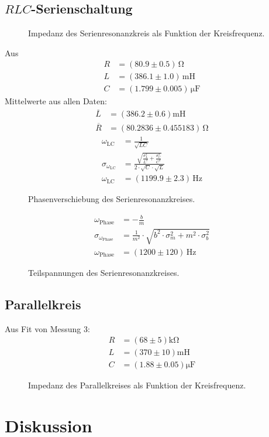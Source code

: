 \documentclass[12pt,a4paper,titlepage,headinclude,bibtotoc]{scrartcl}
\begin{document}
\subsection{$RLC$-Serienschaltung}
\begin{figure}[!htb]
	\centering
	
	\caption{Impedanz des Serienresonanzkreis als Funktion der Kreisfrequenz.}
	\label{fig:messung2}
\end{figure}
Aus
\begin{align}
	R &= (80.9 \pm 0.5)\,\si{\ohm}\\
	L &= (386.1 \pm 1.0)\,\si{\milli\henry}\\
	C &= (1.799 \pm 0.005)\,\si{\micro\farad}
\end{align}
Mittelwerte aus allen Daten:
\begin{align}
\overline L&=(386.2 \pm 0.6)\si{\milli\henry}\\
\overline R&=(80.2836 \pm 0.455183)\,\si{\ohm}
\end{align}
\begin{align}
\omega_\text{LC}&=\frac{1}{\sqrt{LC}}\\
\sigma_{\omega_\text{LC}}&=\frac{\sqrt{\frac{\sigma_{L}^{2}}{L^{2}} + \frac{\sigma_{C}^{2}}{C^{2}}}}{2 \cdot \sqrt{C} \cdot \sqrt{L}}\\
\omega_\text{LC}&=(1199.9 \pm 2.3)\,\si{\hertz}
\end{align}
\begin{figure}[!htb]
	\centering
	
	\caption{Phasenverschiebung des Serienresonanzkreises.}
	\label{fig:phase}
\end{figure}

\begin{align}
\omega_\text{Phase}&=- \frac{b}{m}\\
\sigma_{\omega_\text{Phase}}&=\frac{1}{m^{2}} \cdot \sqrt{b^{2} \cdot \sigma_{m}^{2} + m^{2} \cdot \sigma_{b}^{2}}\\
\omega_\text{Phase}&=(1200 \pm 120)\,\si\hertz
\end{align}
\begin{figure}[!htb]
	\centering
	
	\caption{Teilspannungen des Serienresonanzkreises.}
	\label{fig:teilU}
\end{figure}
\subsection{Parallelkreis}
Aus Fit von Messung 3:
\begin{align}
R &= (68\pm 5)\si{\kilo\ohm}\\
L &= (370 \pm 10)\si{\milli\henry}\\
C &= (1.88  \pm 0.05) \si{\micro\farad}
\end{align}
\begin{figure}[!htb]
	\centering
	
	\caption{Impedanz des Parallelkreises als Funktion der Kreisfrequenz.}
	\label{fig:messung3}
\end{figure}

\section{Diskussion}
\label{sec:diskussion}



\end{document}
